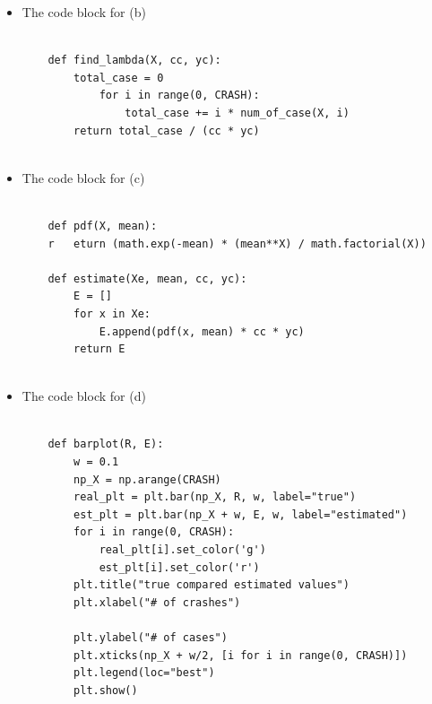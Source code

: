 \documentclass[a4 paper]{article}
\numberwithin{equation}{section}
\newcommand{\0}{\mathbf{0}}
\begin{document}
\begin{itemize}
\begin{verbatim}
\end{verbatim}
	
	
	\item The code block for (b)\\
	\begin{verbatim}
               
    def find_lambda(X, cc, yc):
        total_case = 0
            for i in range(0, CRASH):
                total_case += i * num_of_case(X, i)
        return total_case / (cc * yc)
  
\end{verbatim}
	\item The code block for (c)\\
	\begin{verbatim}
               
    def pdf(X, mean):
    r   eturn (math.exp(-mean) * (mean**X) / math.factorial(X))

    def estimate(Xe, mean, cc, yc):
        E = []
        for x in Xe:
            E.append(pdf(x, mean) * cc * yc)
        return E
  
\end{verbatim}
	\item The code block for (d)\\
	\begin{verbatim}
               
    def barplot(R, E):
        w = 0.1
        np_X = np.arange(CRASH)
        real_plt = plt.bar(np_X, R, w, label="true")
        est_plt = plt.bar(np_X + w, E, w, label="estimated")
        for i in range(0, CRASH):
            real_plt[i].set_color('g') 
            est_plt[i].set_color('r')
        plt.title("true compared estimated values")
        plt.xlabel("# of crashes")

        plt.ylabel("# of cases")
        plt.xticks(np_X + w/2, [i for i in range(0, CRASH)])
        plt.legend(loc="best")
        plt.show()
  
\end{verbatim}
\end{itemize}
\end{document}
